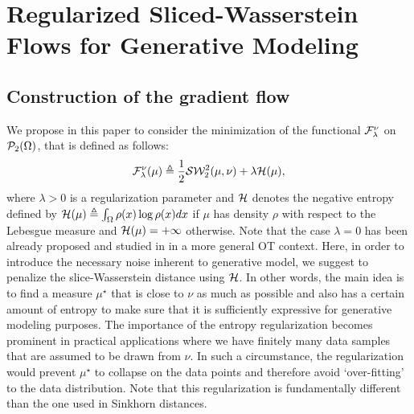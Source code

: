 
\section{Regularized Sliced-Wasserstein Flows for Generative Modeling}





\subsection{Construction of the gradient flow}



%
We propose in this paper to consider the minimization of the functional ${\cal F}^{\nu}_{\lambda}$ on ${\cal P}_2(\Omega)$, that is defined as follows:
\begin{equation}
 {\cal F}^{\nu}_\lambda(\mu) \triangleq  \frac1{2} {\cal S}{\cal W}_2^2(\mu, \nu) + \lambda {\cal H}(\mu),  \label{eqn:sw_optim}
\end{equation}
where $\lambda >0$ is a regularization parameter and ${\cal H}$ denotes the negative entropy defined by ${\cal H}(\mu) \triangleq \int_{\Omega} \rho(x) \log \rho(x) dx $ if $\mu$ has density $\rho$ with respect to the Lebesgue measure and ${\cal H}(\mu) = + \infty$ otherwise. Note that the case $\lambda =0$ has been already proposed and studied in \cite{bonnotte2013unidimensional} in a more general OT context. Here, in order to introduce the necessary noise inherent to generative model, we suggest to penalize the slice-Wasserstein distance using ${\cal H}$. In other words, the main idea is to find a measure $\mu^\star$ that is close to $\nu$ as much as possible and also has a certain amount of entropy to make sure that it is sufficiently expressive for generative modeling purposes.
The importance of the entropy regularization becomes prominent in practical applications where we have finitely many data samples that are assumed to be drawn from $\nu$. In such a circumstance, the regularization would prevent $\mu^\star$ to collapse on the data points and therefore avoid `over-fitting' to the data distribution. Note that this regularization is fundamentally different than the one used in Sinkhorn distances\cite{genevay2018learning}.


